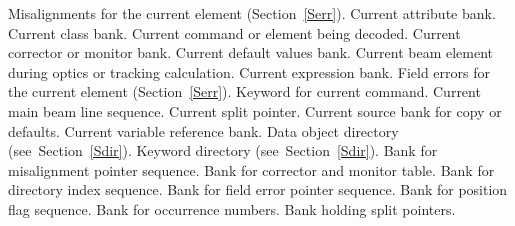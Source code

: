 \begin{mylist}
Misalignments for the current element (Section~\ref{Serr}).
Current attribute bank.
Current class bank. 
Current command or element being decoded.
Current corrector or monitor bank.  
Current default values bank.
Current beam element during optics or tracking calculation.
Current expression bank.
Field errors for the current element (Section~\ref{Serr}).
Keyword for current command.
Current main beam line sequence. 
Current split pointer.  
Current source bank for copy or defaults.   
Current variable reference bank.
Data object directory (see~Section~\ref{Sdir}).
Keyword directory (see~Section~\ref{Sdir}).
Bank for misalignment pointer sequence. 
Bank for corrector and monitor table.   
Bank for directory index sequence.  
Bank for field error pointer sequence.  
Bank for position flag sequence.
Bank for occurrence numbers.
Bank holding split pointers.
\end{mylist}
 
